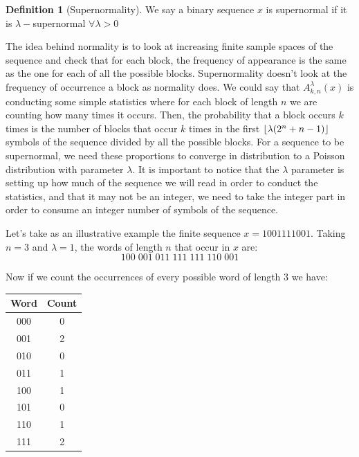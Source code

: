 \documentclass[11pt,a4paper]{tesis}
\theoremstyle{definition}
\newtheorem{definition}{Definition}[section]
\DeclarePairedDelimiter{\floor}{\lfloor}{\rfloor}
\begin{document}
\begin{definition}[Supernormality]
    We say a binary sequence $x$ is supernormal if it is $\lambda-$supernormal $\forall \lambda > 0$
\end{definition}



The idea behind normality is to look at increasing finite sample spaces of the sequence and check that for each block, the frequency of appearance is the same as the one for each of all the possible blocks.
Supernormality doesn't look at the frequency of occurrence a block as normality does. We could say that $A^\lambda_{k,n}(x)$ is conducting some simple statistics where for each block of length $n$ we are counting how many times it occurs. 
 Then, the probability that a block occurs $k$ times is the number of blocks that occur $k$ times in the first $\floor{\lambda(2^n + n - 1)}$ symbols of the sequence divided by all the possible blocks.
For a sequence to be supernormal, we need these proportions to converge in distribution to a Poisson distribution with parameter $\lambda$.
It is important to notice that the $\lambda$ parameter is setting up how much of the sequence we will read in order to conduct the statistics, and that it may not be an integer, we need to take the integer part in order to consume an integer number of symbols of the sequence.


Let's take as an illustrative example the finite sequence $x = 1001111001$. Taking $n=3$ and $\lambda = 1$, the words of length $n$ that occur in $x$ are:
$$100 \; 001 \; 011\; 111\; 111\; 110\; 001$$

Now if we count the occurrences of every possible word of length $3$ we have:

\begin{center}
    \begin{tabular}{|c | c|} 
    \hline
    Word & Count \\ [0.5ex] 
    \hline
    000 & 0 \\ 
    \hline
    001 & 2 \\ 
    \hline
    010 & 0 \\ 
    \hline
    011 & 1 \\ 
    \hline
    100 & 1 \\ 
    \hline
    101 & 0 \\ 
    \hline
    110 & 1 \\ 
    \hline
    111 & 2 \\ 
    \hline
   \end{tabular}
\end{center}
\end{document}
